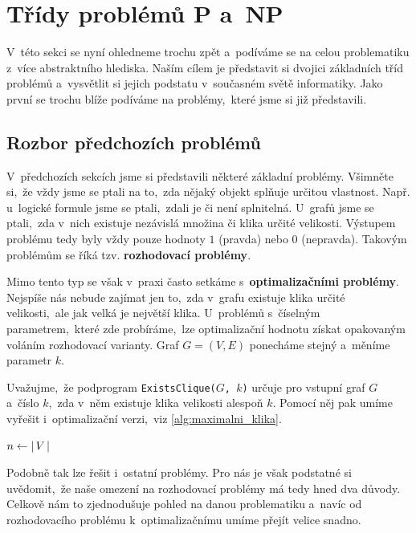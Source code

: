 \section{Třídy problémů P a~NP}\label{sec:p_np}

V~této sekci se nyní ohledneme trochu zpět a~podíváme se na celou problematiku z~více abstraktního hlediska. Naším cílem je představit si dvojici základních tříd problémů a~vysvětlit si jejich podstatu v~současném světě informatiky. Jako první se trochu blíže podíváme na problémy,~které jsme si již představili.

\subsection{Rozbor předchozích problémů}\label{subsec:rozbor_predchozich_problemu}

V~předchozích sekcích jsme si představili některé základní problémy. Všimněte si,~že vždy jsme se ptali na to,~zda nějaký objekt splňuje určitou vlastnost. Např. u~logické formule jsme se ptali,~zdali je či není splnitelná. U~grafů jsme se ptali,~zda v~nich existuje nezávislá množina či klika určité velikosti. Výstupem problému tedy byly vždy pouze hodnoty $1$ (pravda) nebo $0$ (nepravda). Takovým problémům se říká tzv. \textbf{rozhodovací problémy}.

Mimo tento typ se však v~praxi často setkáme s~\textbf{optimalizačními problémy}. Nejspíše nás nebude zajímat jen to,~zda v~grafu existuje klika určité velikosti,~ale jak velká je největší klika. U~problémů s~číselným parametrem,~které zde probíráme,~lze optimalizační hodnotu získat opakovaným voláním rozhodovací varianty. Graf $G=(V,E)$ ponecháme stejný a~měníme parametr $k$.

Uvažujme,~že podprogram \texttt{ExistsClique($G$,~$k$)} určuje pro vstupní graf $G$ a~číslo $k$,~zda v~něm existuje klika velikosti alespoň $k$. Pomocí něj pak umíme vyřešit i~optimalizační verzi,~viz \ref{alg:maximalni_klika}.
\begin{algorithm}
    \caption{Určení maximální kliky v~grafu}
    \label{alg:maximalni_klika}
    $n\gets\left|\,V\,\right|$\\
\end{algorithm}
Podobně tak lze řešit i~ostatní problémy. Pro nás je však podstatné si uvědomit,~že naše omezení na rozhodovací problémy má tedy hned dva důvody. Celkově nám to zjednodušuje pohled na danou problematiku a~navíc od rozhodovacího problému k~optimalizačnímu umíme přejít velice snadno.

